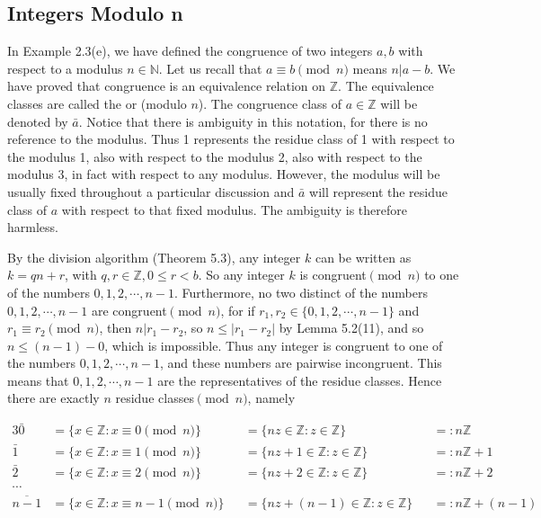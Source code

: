 \documentclass[11pt]{amsbook}
\begin{document}

\subsection{Integers Modulo n}
In Example 2.3(e), we have defined the congruence of two integers $a, b$ with respect
to a modulus $n \in \mathbb{N}$.
Let us recall that $a \equiv b \pmod{n}$ means $n | a-b$.
We have proved that congruence is an equivalence relation on $\mathbb{Z}$.
The equivalence classes are called the  or  (modulo $n$).
The congruence class of $a \in \mathbb{Z}$ will be denoted by $\bar{a}$.
Notice that there is ambiguity in this notation, for there is no reference to the modulus.
Thus 1 represents the residue class of 1 with respect to the modulus 1, also with respect to the modulus 2,
also with respect to the modulus 3, in fact with respect to any modulus.
However, the modulus will be usually fixed throughout a particular discussion and
$\bar{a}$ will represent the residue class of $a$ with respect to that fixed modulus.
The ambiguity is therefore harmless.

By the division algorithm (Theorem 5.3), any integer $k$ can be written as
$k = qn + r$, with $q, r \in \mathbb{Z}, 0 \leq r < b$. So any integer $k$ is
congruent$\pmod{n}$ to one of the numbers $0,1,2,\cdots,n-1$.
Furthermore, no two distinct of the numbers $0,1,2,\cdots,n-1$ are congruent$\pmod{n}$,
for if $r_1, r_2 \in \{0,1,2,\cdots,n-1\}$ and $r_1 \equiv r_2 \pmod{n}$, then
$n | r_1 - r_2$, so $n \leq |r_1 - r_2|$ by Lemma 5.2(11), and so $n \leq (n-1) - 0$,
which is impossible. Thus any integer is congruent to one of the numbers $0,1,2,\cdots,n-1$,
and these numbers are pairwise incongruent. This means that $0,1,2,\cdots,n-1$
are the representatives of the residue classes. Hence there are exactly $n$
residue classes$\pmod{n}$, namely

\begin{alignat*}{3}
  \bar{0}   &= \{ x \in \mathbb{Z}: x \equiv 0 \pmod{n} \}
           &&= \{ nz \in \mathbb{Z}: z \in \mathbb{Z} \}
           &&=: n\mathbb{Z} \\
  \bar{1}   &= \{ x \in \mathbb{Z}: x \equiv 1 \pmod{n} \}
           &&= \{ nz + 1 \in \mathbb{Z}: z \in \mathbb{Z} \}
           &&=: n\mathbb{Z} + 1 \\
  \bar{2}   &= \{ x \in \mathbb{Z}: x \equiv 2 \pmod{n} \}
           &&= \{ nz + 2 \in \mathbb{Z}: z \in \mathbb{Z} \}
           &&=: n\mathbb{Z} + 2 \\
  \cdots \\
  \overline{n-1} &= \{ x \in \mathbb{Z}: x \equiv n - 1 \pmod{n} \}
           &&= \{ nz + (n - 1) \in \mathbb{Z}: z \in \mathbb{Z} \}
           &&=: n\mathbb{Z} + (n - 1)
\end{alignat*}
\end{document}
